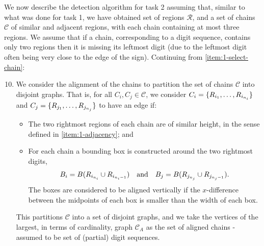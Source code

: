 \documentclass{article}
\begin{document}
We now describe the detection algorithm for task 2 assuming that, similar to
what was done for task 1, we have obtained set of regions $\mathcal{R}$, and a
set of chains $\mathcal{C}$ of similar and adjacent regions, with each chain
containing at most three regions.
We assume that if a chain, corresponding to a digit sequence, contains only two
regions then it is missing its leftmost digit (due to the leftmost digit often
being very close to the edge of the sign).
Continuing from \autoref{item:1-select-chain}:
\begin{enumerate}
  \setcounter{enumi}{9}
\item
  We consider the alignment of the chains to partition the set of chains
  $\mathcal{C}$ into disjoint graphs.
  That is, for all $C_{i}, C_{j} \in \mathcal{C}$, we consider
  $C_{i} = \lbrace R_{i_{1}}, \dotsc, R_{i_{n_{i}}}\rbrace$ and
  $C_{j} = \lbrace R_{j_{1}}, \dotsc, R_{j_{n_{j}}}\rbrace$ to have an edge if:
  \begin{itemize}
  \item
    The two rightmost regions of each chain are of similar height, in the sense
    defined in \autoref{item:1-adjacency}; and

  \item
    For each chain a bounding box is constructed around the two rightmost
    digits,
    \begin{equation*}
      B_{i}
      =
      B\lr{R_{i_{n_{i}}} \cup R_{i_{n_{i} - 1}}}
      \qq{and}
      B_{j}
      =
      B\lr{R_{j_{n_{j}}} \cup R_{j_{n_{j} - 1}}}
      .
    \end{equation*}
    The boxes are considered to be aligned vertically if the $x$-difference
    between the midpoints of each box is smaller than the width of each box.
  \end{itemize}
  This partitions $\mathcal{C}$ into a set of disjoint graphs, and we take the
  vertices of the largest, in terms of cardinality, graph
  $\mathcal{C}_{A}$ as the set of aligned chains - assumed to be set of
  (partial) digit sequences.


\end{enumerate}
\end{document}
